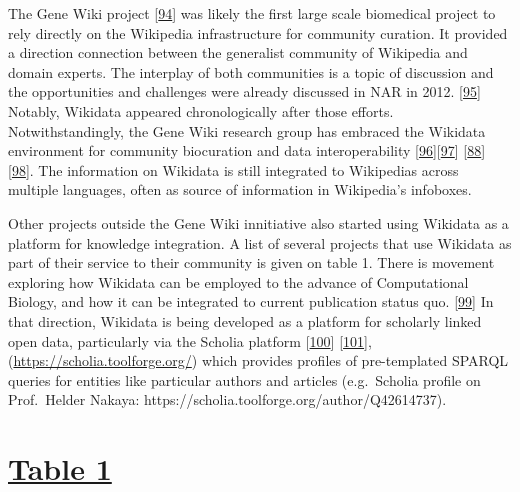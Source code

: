 The Gene Wiki project {[}\protect\hyperlink{ref-18UXATsxP}{94}{]} was likely the first large scale biomedical project to rely directly on the Wikipedia infrastructure for community curation.
It provided a direction connection between the generalist community of Wikipedia and domain experts.
The interplay of both communities is a topic of discussion and the opportunities and challenges were already discussed in NAR in 2012. {[}\protect\hyperlink{ref-13LWXQF0E}{95}{]}\\
Notably, Wikidata appeared chronologically after those efforts.\\
Notwithstandingly, the Gene Wiki research group has embraced the Wikidata environment for community biocuration and data interoperability {[}\protect\hyperlink{ref-2ZhxC0dg}{96}{]}{[}\protect\hyperlink{ref-DaJdrXLk}{97}{]} {[}\protect\hyperlink{ref-3GqlN9Dk}{88}{]} {[}\protect\hyperlink{ref-aQfGxPRH}{98}{]}.
The information on Wikidata is still integrated to Wikipedias across multiple languages, often as source of information in Wikipedia's infoboxes.

Other projects outside the Gene Wiki innitiative also started using Wikidata as a platform for knowledge integration.
A list of several projects that use Wikidata as part of their service to their community is given on table 1.
There is movement exploring how Wikidata can be employed to the advance of Computational Biology, and how it can be integrated to current publication status quo. {[}\protect\hyperlink{ref-1GijvCQtv}{99}{]}
In that direction, Wikidata is being developed as a platform for scholarly linked open data, particularly via the Scholia platform {[}\protect\hyperlink{ref-hxzL9pmm}{100}{]} {[}\protect\hyperlink{ref-PdG2G4Bp}{101}{]},(\url{https://scholia.toolforge.org/}) which provides profiles of pre-templated SPARQL queries for entities like particular authors and articles (e.g.~Scholia profile on Prof.~Helder Nakaya: https://scholia.toolforge.org/author/Q42614737).

\hypertarget{table-1}{%
\section{\texorpdfstring{\href{https://docs.google.com/spreadsheets/d/1loPE0bfJsih4eLrwNGvQf2c-9_I8z-GEvV21496o8h8/edit\#gid=0}{Table 1}}{Table 1}}\label{table-1}}

